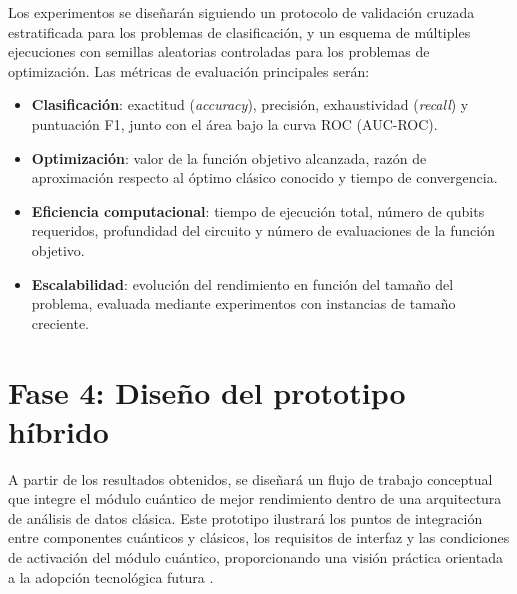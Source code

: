 Los experimentos se diseñarán siguiendo un protocolo de validación cruzada estratificada para los problemas de clasificación, y un esquema de múltiples ejecuciones con semillas aleatorias controladas para los problemas de optimización. Las métricas de evaluación principales serán:

\begin{itemize}
    \item \textbf{Clasificación}: exactitud (\textit{accuracy}), precisión, exhaustividad (\textit{recall}) y puntuación F1, junto con el área bajo la curva ROC (AUC-ROC).
    \item \textbf{Optimización}: valor de la función objetivo alcanzada, razón de aproximación respecto al óptimo clásico conocido y tiempo de convergencia.
    \item \textbf{Eficiencia computacional}: tiempo de ejecución total, número de qubits requeridos, profundidad del circuito y número de evaluaciones de la función objetivo.
    \item \textbf{Escalabilidad}: evolución del rendimiento en función del tamaño del problema, evaluada mediante experimentos con instancias de tamaño creciente.
\end{itemize}

\section{Fase 4: Diseño del prototipo híbrido}

A partir de los resultados obtenidos, se diseñará un flujo de trabajo conceptual que integre el módulo cuántico de mejor rendimiento dentro de una arquitectura de análisis de datos clásica. Este prototipo ilustrará los puntos de integración entre componentes cuánticos y clásicos, los requisitos de interfaz y las condiciones de activación del módulo cuántico, proporcionando una visión práctica orientada a la adopción tecnológica futura \citep{cerezo2021}.
